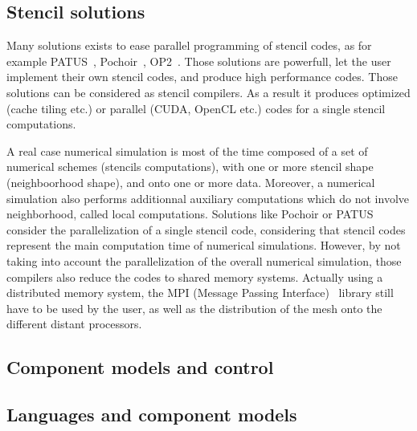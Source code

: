 \subsection{Stencil solutions}

Many solutions exists to ease parallel programming of stencil codes, as for example PATUS~\cite{citeulike12258902}, Pochoir~\cite{spaaTangCKLL11}, OP2~\cite{Giles2011}. Those solutions are powerfull, let the user implement their own stencil codes, and produce high performance codes. Those solutions can be considered as stencil compilers. As a result it produces optimized (cache tiling etc.) or parallel (CUDA, OpenCL etc.) codes for a single stencil computations. 

A real case numerical simulation is most of the time composed of a set of numerical schemes (stencils computations), with one or more stencil shape (neighboorhood shape), and onto one or more data. Moreover, a numerical simulation also performs additionnal auxiliary computations which do not involve neighborhood, called local computations. Solutions like Pochoir or PATUS consider the parallelization of a single stencil code, considering that stencil codes represent the main computation time of numerical simulations. However, by not taking into account the parallelization of the overall numerical simulation, those compilers also reduce the codes to shared memory systems. Actually using a distributed memory system, the MPI (Message Passing Interface)~\cite{Graham2009MSE} library still have to be used by the user, as well as the distribution of the mesh onto the different distant processors.

\subsection{Component models and control}

\subsection{Languages and component models}
